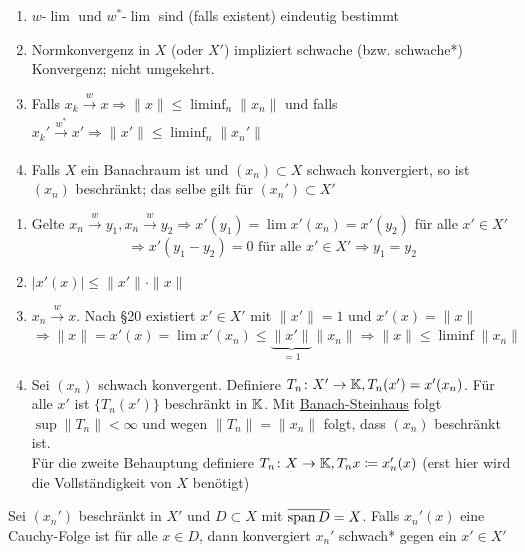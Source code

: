 \begin{eig}
	\begin{enumerate}[label=\alph*\upshape)]
		\item $w$-$\lim$ und $w^{*}$-$\lim$ sind (falls existent) eindeutig bestimmt
		\item Normkonvergenz in $X$ (oder $X'$) impliziert schwache (bzw. schwache*) Konvergenz; nicht umgekehrt.
		\item Falls $x_{k} \xrightarrow[]{w} x \Rightarrow \| x \| \leq \liminf_{n} \| x_{n} \|$ und falls $x_{k}' \xrightarrow[]{w^{*}} x' \Rightarrow \| x' \| \leq \liminf_{n} \| x_{n}' \|$ 
		\item Falls $X$ ein Banachraum ist und $(x_{n}) \subset X$ schwach konvergiert, so ist $(x_{n})$ beschränkt; das selbe gilt für $(x_{n}') \subset X'$
	\end{enumerate}	
\end{eig}


\begin{beweis}
	\begin{enumerate}[label=\alph*\upshape)]
		\item Gelte $x_{n} \xrightarrow[]{w} y_{1}, x_{n} \xrightarrow[]{w} y_{2} \Rightarrow x'(y_{1}) = \lim x'(x_{n}) = x'(y_{2})$ für alle $x' \in X'$
			\[ \Rightarrow x'(y_{1} - y_{2}) = 0 \text{ für alle } x' \in X' \Rightarrow y_{1} = y_{2} \]
		\item $| x'(x) | \leq \| x' \| \cdot \| x \|$
		\item $x_{n} \xrightarrow[]{w} x$. Nach \S 20 existiert $x' \in X'$ mit $\| x' \| = 1$ und $x'(x) = \| x \|$
			\[ \Rightarrow \| x \| = x'(x) = \lim x'(x_{n}) \leq \underbrace{\| x' \|}_{= 1} \| x_{n} \| \Rightarrow \| x \| \leq \liminf \| x_{n} \| \]
		\item Sei $(x_{n})$ schwach konvergent. Definiere $T_{n} \colon X' \rightarrow \mathbb{K}, T_{n}(x') = x'(x_{n})$. Für alle $x'$ ist $\{ T_{n}(x') \}$ beschränkt in $\mathbb{K}$. Mit \hyperref[satz:9.5-Banach-Steinhaus]{Banach-Steinhaus} folgt $\sup \| T_{n} \| < \infty$ und wegen $\| T_{n} \| = \| x_{n} \|$ folgt, dass $(x_{n})$ beschränkt ist. \\
			Für die zweite Behauptung definiere $T_{n} \colon X \rightarrow \mathbb{K}, T_{n} x \coloneqq x_{n}'(x)$ (erst hier wird die Vollständigkeit von $X$ benötigt)
	\end{enumerate}		
\end{beweis}


\begin{lemma}
	Sei $(x_{n}')$ beschränkt in $X'$ und $D \subset X$ mit $\overline{\operatorname{span} D} = X$. Falls $x_{n}'(x)$ eine Cauchy-Folge ist für alle $x \in D$, dann konvergiert $x_{n}'$ schwach* gegen ein $x' \in X'$
\end{lemma}


